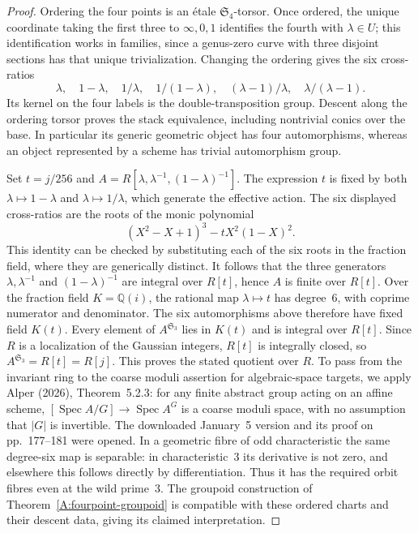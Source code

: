 \begin{proof}
Ordering the four points is an \'etale $\mathfrak S_4$-torsor. Once
ordered, the unique coordinate taking the first three to
$\infty,0,1$ identifies the fourth with $\lambda\in U$; this
identification works in families, since a genus-zero curve with
three disjoint sections has that unique trivialization. Changing
the ordering gives the six cross-ratios
\[
 \lambda,\quad1-\lambda,\quad1/\lambda,\quad
 1/(1-\lambda),\quad(\lambda-1)/\lambda,\quad
 \lambda/(\lambda-1).
\]
Its kernel on the four labels is the double-transposition group.
Descent along the ordering torsor proves the stack equivalence,
including nontrivial conics over the base. In particular its generic
geometric object has four automorphisms, whereas an object represented
by a scheme has trivial automorphism group.

Set $t=j/256$ and $A=R[\lambda,\lambda^{-1},(1-\lambda)^{-1}]$.
The expression $t$ is fixed by both $\lambda\mapsto1-\lambda$ and
$\lambda\mapsto1/\lambda$, which generate the effective action.
The six displayed cross-ratios are the roots of the monic polynomial
\[
 (X^2-X+1)^3-tX^2(1-X)^2.
\]
This identity can be checked by substituting each of the six roots
in the fraction field, where they are generically distinct.
It follows that the three generators $\lambda,\lambda^{-1}$ and
$(1-\lambda)^{-1}$ are integral over $R[t]$, hence $A$ is finite over
$R[t]$. Over the fraction field $K=\mathbb Q(i)$, the rational map
$\lambda\mapsto t$ has degree~6, with coprime numerator and
denominator. The six automorphisms above therefore have fixed field
$K(t)$. Every element of $A^{\mathfrak S_3}$ lies in $K(t)$ and is
integral over $R[t]$. Since $R$ is a localization of the Gaussian
integers, $R[t]$ is integrally closed, so
$A^{\mathfrak S_3}=R[t]=R[j]$. This proves the stated quotient over
$R$. To pass from the invariant ring to the coarse moduli assertion
for algebraic-space targets, we apply Alper (2026), Theorem~5.2.3:
for any finite abstract group acting on an affine scheme,
$[\operatorname{Spec}A/G]\to\operatorname{Spec}A^G$ is a coarse
moduli space, with no assumption that $|G|$ is invertible.
The downloaded January~5 version and its proof on pp.~177--181
were opened. In a geometric fibre of odd characteristic the same degree-six
map is separable: in characteristic~3 its derivative is not zero,
and elsewhere this follows directly by differentiation. Thus it has
the required orbit fibres even at the wild prime~3. The groupoid
construction of Theorem~\ref{A:fourpoint-groupoid} is compatible with
these ordered charts and their descent data, giving its claimed
interpretation.
\end{proof}

